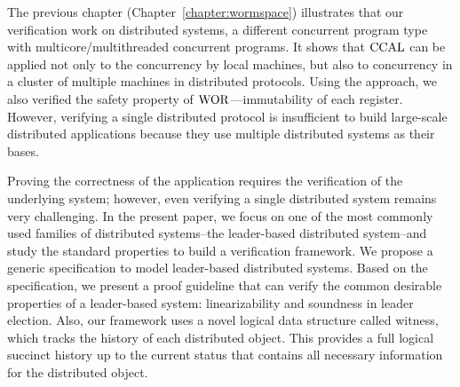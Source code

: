 The previous chapter (Chapter~\ref{chapter:wormspace})
illustrates that our verification work on distributed systems, 
a different concurrent program type with multicore/multithreaded concurrent programs. 
It shows that $\mathrm{CCAL}$ can be applied not only to the concurrency by local machines, but also to concurrency in a cluster of multiple machines in distributed protocols. Using the approach, we also verified the safety property of $\mathrm{WOR}$---immutability of each register.
However, verifying a single distributed protocol is insufficient to build large-scale distributed applications because they use multiple distributed systems as their bases.


Proving the correctness of the application requires the verification of the underlying system;
 however, even verifying a single distributed system remains very challenging. 
 In the present paper, we focus on one of the most commonly used families of distributed systems--the leader-based distributed system--and study the standard properties to build a verification framework.
  We propose a generic specification to model leader-based distributed systems. 
  Based on the specification, we present a proof guideline that can verify the common desirable properties of a leader-based system: linearizability and soundness in leader election. 
  Also, our framework uses a novel logical data structure called witness, which tracks the history of each distributed object. 
  This provides a full logical succinct history up to the current status that contains all necessary information for the distributed object.
